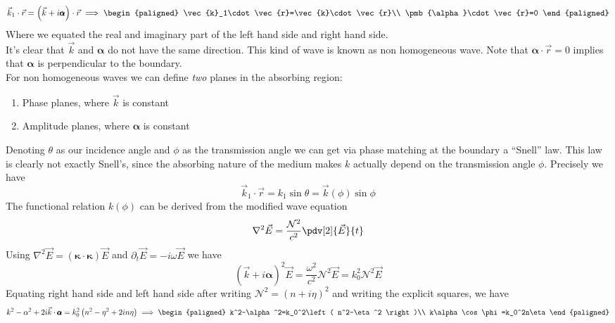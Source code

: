 \documentclass[../electromagnetism.tex]{subfiles}
\begin{document}
\begin{equation}
	\vec{k}_1\cdot\vec{r}=\left( \vec{k}+i\pmb{\alpha} \right)\cdot\vec{r}\implies\begin{paligned}
		\vec{k}_1\cdot\vec{r}=\vec{k}\cdot\vec{r}\\
		\pmb{\alpha}\cdot\vec{r}=0
	\end{paligned}
	\label{eq:snell2.rra}
\end{equation}
Where we equated the real and imaginary part of the left hand side and right hand side.\\
It's clear that $\vec{k}$ and $\pmb{\alpha}$ do not have the same direction. This kind of wave is known as non homogeneous wave. Note that $\pmb{\alpha}\cdot\vec{r}=0$ implies that $\pmb{\alpha}$ is perpendicular to the boundary.\\
For non homogeneous waves we can define \textit{two} planes in the absorbing region: 
\begin{enumerate}
\item Phase planes, where $\vec{k}$ is constant
\item Amplitude planes, where $\pmb{\alpha}$ is constant
\end{enumerate}
Denoting $\theta$ as our incidence angle and $\phi$ as the transmission angle we can get via phase matching at the boundary a ``Snell'' law. This law is clearly not exactly Snell's, since the absorbing nature of the medium makes $k$ actually depend on the transmission angle $\phi$. Precisely we have
\begin{equation}
	\vec{k}_1\cdot\vec{r}=k_1\sin\theta=\vec{k}(\phi)\sin\phi
	\label{eq:snell3.rra}
\end{equation}
The functional relation $k(\phi)$ can be derived from the modified wave equation
\begin{equation}
	\nabla^2\vec{E}=\frac{\mathcal{N}^2}{c^2}\pdv[2]{\vec{E}}{t}
	\label{eq:modweq.rra}
\end{equation}
Using $\nabla^2\vec{E}=(\pmb{\kappa}\cdot\pmb{\kappa})\vec{E}$ and $\partial_t\vec{E}=-i\omega\vec{E}$ we have
\begin{equation*}
	\left( \vec{k}+i\pmb{\alpha} \right)^2\vec{E}=\frac{\omega^2}{c^2}\mathcal{N}^2\vec{E}=k_0^2\mathcal{N}^2\vec{E}
\end{equation*}
Equating right hand side and left hand side after writing $\mathcal{N}^2=\left( n+i\eta \right)^2$ and writing the explicit squares, we have
\begin{equation}
	k^2-\alpha^2+2i\vec{k}\cdot\pmb{\alpha}=k_0^2\left( n^2-\eta^2+2in\eta \right)\implies\begin{paligned}
		k^2-\alpha^2=k_0^2\left( n^2-\eta^2 \right)\\
		k\alpha\cos\phi=k_0^2n\eta
	\end{paligned}
	\label{eq:funcrelkphi.rra}
\end{equation}
\end{document}
